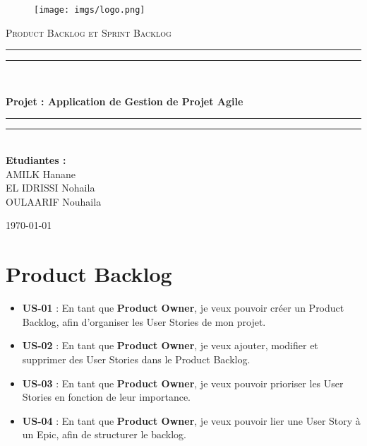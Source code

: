 \documentclass[a4paper,12pt]{article}
\begin{document}
\begin{titlepage}
    \centering
\begin{figure}
        \centering
        \texttt{[image: imgs/logo.png]}
    \end{figure}
    {\scshape\Large Product Backlog et Sprint Backlog\\ \par}
    \vspace{2cm}
    \rule{\textwidth}{1.6pt}\vspace*{-\baselineskip}\vspace*{2pt}
    \rule{\textwidth}{0.4pt}\\[\baselineskip]
    {\huge\bfseries Projet : Application de Gestion de Projet Agile\par}
    \vspace{0.5cm}
    \rule{\textwidth}{0.4pt}\vspace*{-\baselineskip}\vspace{3.2pt}
    \rule{\textwidth}{1.6pt}\\[\baselineskip]


    \vspace{2cm}
    \vfill
    \large\textbf{Etudiantes :}\\
    \vspace{0.5 cm}
        AMILK Hanane \\
        EL IDRISSI Nohaila \\
        OULAARIF Nouhaila

    \vfill
    \vfill
    {\large \today\par}
\end{titlepage}
\tableofcontents
\newpage
\section{Product Backlog}

\begin{tcolorbox}[colframe=darkblue,colback=lightgray,title=\textbf{Epic 1 : Gestion du Product Backlog}]
\begin{itemize}
    \item \textbf{US-01} : En tant que \textbf{Product Owner}, je veux pouvoir créer un Product Backlog, afin d’organiser les User Stories de mon projet.
    \item \textbf{US-02} : En tant que \textbf{Product Owner}, je veux ajouter, modifier et supprimer des User Stories dans le Product Backlog.
    \item \textbf{US-03} : En tant que \textbf{Product Owner}, je veux pouvoir prioriser les User Stories en fonction de leur importance.
    \item \textbf{US-04} : En tant que \textbf{Product Owner}, je veux pouvoir lier une User Story à un Epic, afin de structurer le backlog.
\end{itemize}
\end{tcolorbox}
\end{document}
